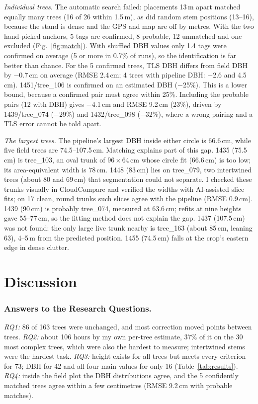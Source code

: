 \documentclass[runningheads]{llncs}
\begin{document}
\emph{Individual trees.} The automatic search failed: placements 13\,m apart matched equally many trees (16 of 26 within 1.5\,m), as did random stem positions (13--16), because the stand is dense and the GPS and map are off by metres. With the two hand-picked anchors, 5 tags are confirmed, 8 probable, 12 unmatched and one excluded (Fig.~\ref{fig:match}). With shuffled DBH values only 1.4 tags were confirmed on average (5 or more in 0.7\% of runs), so the identification is far better than chance. For the 5 confirmed trees, TLS DBH differs from field DBH by $-$0.7\,cm on average (RMSE 2.4\,cm; 4 trees with pipeline DBH: $-$2.6 and 4.5\,cm). 1451/tree\_106 is confirmed on an estimated DBH ($-$25\%). This is a lower bound, because a confirmed pair must agree within 25\%. Including the probable pairs (12 with DBH) gives $-$4.1\,cm and RMSE 9.2\,cm (23\%), driven by 1439/tree\_074 ($-$29\%) and 1432/tree\_098 ($-$32\%), where a wrong pairing and a TLS error cannot be told apart.

\emph{The largest trees.} The pipeline's largest DBH inside either circle is 66.6\,cm, while five field trees are 74.5--107.5\,cm. Matching explains part of this gap. 1435 (75.5\,cm) is tree\_103, an oval trunk of 96\,$\times$\,64\,cm whose circle fit (66.6\,cm) is too low; its area-equivalent width is 78\,cm. 1448 (83\,cm) lies on tree\_079, two intertwined trees (about 80 and 69\,cm) that segmentation could not separate. I checked these trunks visually in CloudCompare and verified the widths with AI-assisted slice fits; on 17 clean, round trunks such slices agree with the pipeline (RMSE 0.9\,cm). 1439 (90\,cm) is probably tree\_074, measured at 63.6\,cm; refits at nine heights gave 55--77\,cm, so the fitting method does not explain the gap. 1437 (107.5\,cm) was not found: the only large live trunk nearby is tree\_163 (about 85\,cm, leaning 63\textdegree), 4--5\,m from the predicted position. 1455 (74.5\,cm) falls at the crop's eastern edge in dense clutter.%
\section{Discussion}\label{sec:discussion}

\subsubsection{Answers to the Research Questions.}
\emph{RQ1:} 86 of 163 trees were unchanged, and most correction moved points between trees. \emph{RQ2:} about 106 hours by my own per-tree estimate, 37\% of it on the 30 most complex trees, which were also the hardest to measure; intertwined stems were the hardest task. \emph{RQ3:} height exists for all trees but meets every criterion for 73; DBH for 42 and all four main values for only 16 (Table~\ref{tab:results}). \emph{RQ4:} inside the field plot the DBH distributions agree, and the 5 confidently matched trees agree within a few centimetres (RMSE 9.2\,cm with probable matches).
\end{document}
